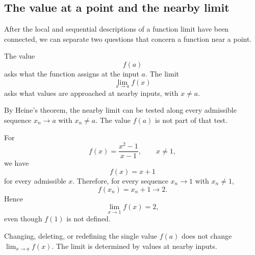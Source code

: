 \subsection{The value at a point and the nearby limit}

After the local and sequential descriptions of a function limit have been connected, we can separate two questions that concern a function near a point.

\begin{corebox}
The value
\[
f(a)
\]
asks what the function assigns at the input $a$. The limit
\[
\lim_{x\to a}f(x)
\]
asks what values are approached at nearby inputs, with $x\ne a$.
\end{corebox}

By Heine's theorem, the nearby limit can be tested along every admissible sequence $x_n\to a$ with $x_n\ne a$. The value $f(a)$ is not part of that test.

\begin{examplebox}
For
\[
f(x)=\frac{x^2-1}{x-1},
\qquad x\ne1,
\]
we have
\[
f(x)=x+1
\]
for every admissible $x$. Therefore, for every sequence $x_n\to1$ with $x_n\ne1$,
\[
f(x_n)=x_n+1\to2.
\]
Hence
\[
\lim_{x\to1}f(x)=2,
\]
even though $f(1)$ is not defined.
\end{examplebox}

\begin{interpretationbox}
Changing, deleting, or redefining the single value $f(a)$ does not change $\lim_{x\to a}f(x)$. The limit is determined by values at nearby inputs.
\end{interpretationbox}
